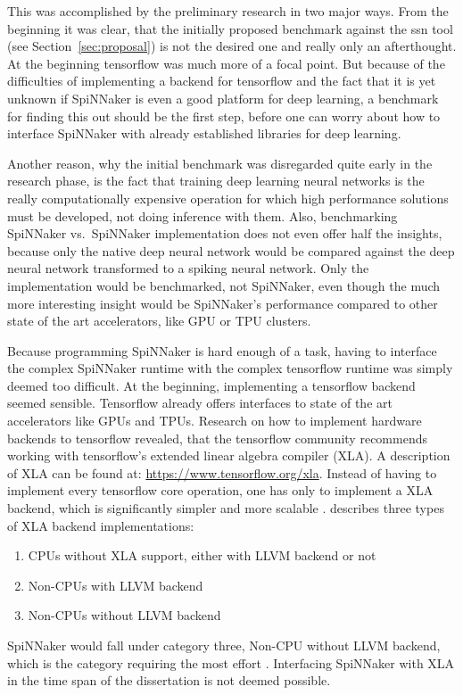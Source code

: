\documentclass{article}
\begin{document}
This was accomplished by the preliminary research in two
major ways.
From the beginning it was clear, that the initially
proposed benchmark against the ssn tool (see
Section~\ref{sec:proposal}) is not the desired one and
really only an afterthought.
At the beginning tensorflow was much more of a focal point.
But because of the difficulties of implementing a backend
for tensorflow and the fact that it is yet unknown if
SpiNNaker is even a good platform for deep learning, a
benchmark for finding this out should be the first step,
before one can worry about how to interface SpiNNaker with
already established libraries for deep learning.

Another reason, why the initial benchmark was disregarded
quite early in the research phase, is the fact that
training deep learning neural networks is the really
computationally expensive operation for which high
performance solutions must be developed, not doing
inference with them.
Also, benchmarking SpiNNaker vs.\ SpiNNaker implementation
does not even offer half the insights, because only the
native deep neural network would be compared against the
deep neural network transformed to a spiking neural
network.
Only the implementation would be benchmarked, not
SpiNNaker, even though the much more interesting insight
would be SpiNNaker's performance compared to other state
of the art accelerators, like GPU or TPU clusters.

Because programming SpiNNaker is hard enough of a task,
having to interface the complex SpiNNaker runtime with the
complex tensorflow runtime was simply deemed too difficult.
At the beginning, implementing a tensorflow backend seemed
sensible.
Tensorflow already offers interfaces to state of the art
accelerators like GPUs and TPUs.
Research on how to implement hardware backends to
tensorflow revealed, that the tensorflow community
recommends working with tensorflow's extended linear
algebra compiler (XLA).
A description of XLA can be found at:
\url{https://www.tensorflow.org/xla}.
Instead of having to implement every tensorflow core
operation, one has only to implement a XLA backend, which
is significantly simpler and more scalable
\citep{xla_backend}.
\citet{xla_backend} describes three types of XLA backend
implementations:
\begin{enumerate}
  \item CPUs without XLA support, either with LLVM backend
    or not
  \item Non-CPUs with LLVM backend
  \item Non-CPUs without LLVM backend
\end{enumerate}
SpiNNaker would fall under category three, Non-CPU without
LLVM backend, which is the category requiring the most
effort \citep{xla_backend}.
Interfacing SpiNNaker with XLA in the time span of the
dissertation is not deemed possible.
\end{document}
